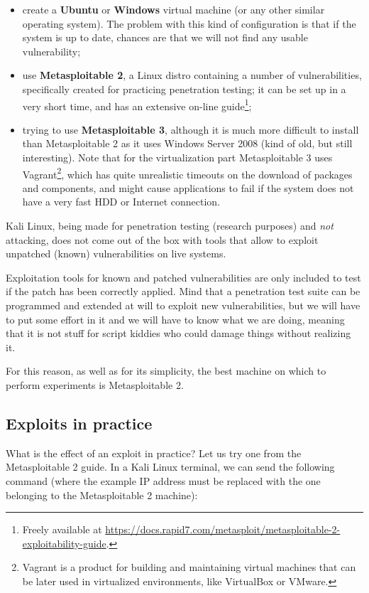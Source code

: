 \begin{itemize}
	\item create a \textbf{Ubuntu} or \textbf{Windows} virtual machine (or any other similar operating system). The problem with this kind of configuration is that if the system is up to date, chances are that we will not find any usable vulnerability;
	\item use \textbf{Metasploitable 2}, a Linux distro containing a number of vulnerabilities, specifically created for practicing penetration testing; it can be set up in a very short time, and has an extensive on-line guide\footnote{Freely available at \url{https://docs.rapid7.com/metasploit/metasploitable-2-exploitability-guide}.};
	\item trying to use \textbf{Metasploitable 3}, although it is much more difficult to install than Metasploitable 2 as it uses Windows Server 2008 (kind of old, but still interesting). Note that for the virtualization part Metasploitable 3 uses Vagrant\footnote{Vagrant is a product for building and maintaining virtual machines that can be later used in virtualized environments, like VirtualBox or VMware.}, which has quite unrealistic timeouts on the download of packages and components, and might cause applications to fail if the system does not have a very fast HDD or Internet connection. 
\end{itemize}

Kali Linux, being made for penetration testing (research purposes) and \textit{not} attacking, does not come out of the box with tools that allow to exploit unpatched (known) vulnerabilities on live systems.

Exploitation tools for known and patched vulnerabilities are only included to test if the patch has been correctly applied. Mind that a penetration test suite can be programmed and extended at will to exploit new vulnerabilities, but we will have to put some effort in it and we will have to know what we are doing, meaning that it is not stuff for script kiddies who could damage things without realizing it.

For this reason, as well as for its simplicity, the best machine on which to perform experiments is Metasploitable 2.


\subsection{Exploits in practice} 
What is the effect of an exploit in practice? Let us try one from the Metasploitable 2 guide. In a Kali Linux terminal, we can send the following command (where the example IP address must be replaced with the one belonging to the Metasploitable 2 machine):

